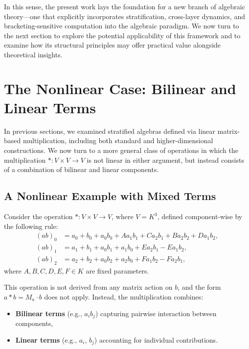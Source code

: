 \documentclass[12pt]{article}
\theoremstyle{definition}
\theoremstyle{plain}
\theoremstyle{remark}
\begin{document}
In this sense, the present work lays the foundation for a new branch of algebraic theory—one that explicitly incorporates stratification, cross-layer dynamics, and bracketing-sensitive computation into the algebraic paradigm. We now turn to the next section to explore the potential applicability of this framework and to examine how its structural principles may offer practical value alongside theoretical insights.

\section{The Nonlinear Case: Bilinear and Linear Terms}

In previous sections, we examined stratified algebras defined via linear matrix-based multiplication, including both standard and higher-dimensional constructions. We now turn to a more general class of operations in which the multiplication \( * : V \times V \to V \) is not linear in either argument, but instead consists of a combination of bilinear and linear components.

\subsection{A Nonlinear Example with Mixed Terms}

Consider the operation \( * : V \times V \to V \), where \( V = K^3 \), defined component-wise by the following rule:
\begin{align*}
(ab)_0 &= a_0 + b_0 + a_0 b_0 + A a_1 b_1 + C a_2 b_1 + B a_2 b_2 + D a_1 b_2, \\
(ab)_1 &= a_1 + b_1 + a_0 b_1 + a_1 b_0 + E a_2 b_1 - E a_1 b_2, \\
(ab)_2 &= a_2 + b_2 + a_0 b_2 + a_2 b_0 + F a_1 b_2 - F a_2 b_1,
\end{align*}
where \( A, B, C, D, E, F \in K \) are fixed parameters.

This operation is not derived from any matrix action on \( b \), and the form \( a * b = M_a \cdot b \) does not apply. Instead, the multiplication combines:
\begin{itemize}
    \item \textbf{Bilinear terms} (e.g., \( a_i b_j \)) capturing pairwise interaction between components,
    \item \textbf{Linear terms} (e.g., \( a_i \), \( b_j \)) accounting for individual contributions.
\end{itemize}
\end{document}
